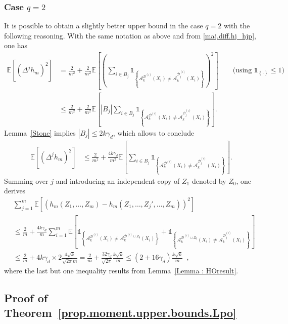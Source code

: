 \documentclass[twoside,11pt]{article}
\numberwithin{equation}{section}
\newcommand{\esp}[1]{\mathbb{E}\left[#1 \right]}
\newcommand{\gp}[1]{\left(#1\right)}
\newcommand{\ga}[1]{\left\{#1\right\}}
\newcommand{\1}{\mathds{1}}%
\newcommand{\ind}[1]{\1_{\ga{#1}}}%
\newcommand{\paren}[1]{\left( #1 \right)}
\newcommand{\acc}[1]{\left\{ #1 \right\}}
\newcommand{\abs}[1]{\left\lvert #1 \right\rvert} %
\newcommand{\D}{\mathcal{D}}
\newcommand{\A}{\mathcal{A}}
\numberwithin{equation}{section}
\theoremstyle{plain}
\begin{document}
\subsubsection{Case $q=2$}
It is possible to obtain a slightly better upper bound in the case $q=2$ with the following reasoning.
%
With the same notation as above and from \eqref{maj.diff.hj_hjp}, one has
\begin{align*}
\esp{ \gp{    \Delta^j h_m }^2 }
%
& = \frac{2}{m^2} + \frac{2}{m^2} \esp{ \gp{\sum_{i\in B_j}  \ind{ \A_k^{\D^{(i)}}\paren{X_i } \neq \A_k^{\D_j^{(i)}}\paren{X_i} }  }^2} \qquad \mbox{(using $\1_{\acc{\cdot}} \leq 1$)}\\
%
& \leq \frac{2}{m^2} + \frac{2}{m^2} \esp{ |B_j| \sum_{i\in B_j}  \ind{ \A_k^{\D^{(i)}}\paren{X_i } \neq \A_k^{\D_j^{(i)}}\paren{X_i} }  }.
%
\end{align*}
%
Lemma~\ref{Stone} implies $\abs{B_j} \leq 2 k \gamma_d$, which allows to conclude
\begin{align*}
\esp{ \gp{  \Delta^j h_m }^2 }
& \leq \frac{2}{m^2} + \frac{4k\gamma_d}{m^2} \esp{ \sum_{i\in B_j} \ind{ \A_k^{\D^{(i)}}\paren{X_i } \neq \A_k^{\D_j^{(i)}}\paren{X_i} }  }.
\end{align*}
%
Summing over $j$ and introducing an independent copy of $Z_1$ denoted by $Z_0$, one derives
\begin{align}
&\sum_{j=1}^m\esp{ \gp{   h_m(Z_1,\ldots,Z_m)-h_m(Z_1,\ldots,Z_j',\ldots,Z_m) }^2 } \nonumber \\
%
%
& \leq \frac{2}{m} + \frac{4k\gamma_d}{m} \sum_{i=1}^m\esp{ \ind{ \A_k^{\D^{(i)}}\paren{X_i } \neq  \A_k^{\D^{(i)}\cup Z_0}\paren{ X_i} } +\ind{ \A_k^{\D^{(i)}\cup Z_0}\paren{X_i} \neq  \A_k^{\D_j^{(i)}}\paren{X_i } } }  \nonumber \\
%
& \leq \frac{2}{m} + 4k\gamma_d \times 2 \frac{4\sqrt{k}}{\sqrt{2\pi}m} = \frac{2}{m} + \frac{32\gamma_d}{\sqrt{2\pi}}\frac{k\sqrt{k}}{m} \leq (2+16\gamma_d) \frac{k\sqrt{k}}{m} \enspace , \label{ineq.technical.proof.improved}
\end{align}
where the last but one inequality results from Lemma~\ref{Lemma : HOresult}.





\subsection{Proof of Theorem~\ref{prop.moment.upper.bounds.Lpo}}
%
\label{sec.proof.upper.bound.moments.Lpo}
%
\end{document}
